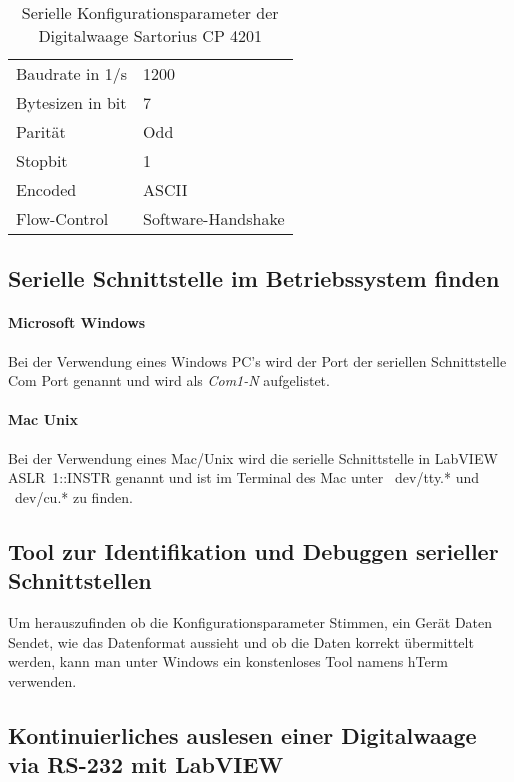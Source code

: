 \documentclass[
fontsize=12pt, 
paper=a4, 
BCOR=10mm, 
twoside=false,
 DIV=10, 
 headsepline, 
 footsepline
 ]{scrartcl}
\begin{document}
\begin{table}[h]
\caption{Serielle Konfigurationsparameter der Digitalwaage Sartorius CP 4201}
\begin{center}

\begin{tabularx}{1\textwidth}{XX}
\hline
Baudrate in 1/s & 1200 \\
Bytesizen in bit & 7  \\
Parität & Odd \\
Stopbit & 1 \\
Encoded & ASCII \\
Flow-Control & Software-Handshake \\
\hline
\end{tabularx}
\end{center}
\label{cp4201}
\end{table}

\subsection{Serielle Schnittstelle im Betriebssystem finden} 
\paragraph{Microsoft Windows} Bei der Verwendung eines Windows PC's wird der Port der seriellen Schnittstelle Com Port genannt und wird als \textit{Com1-N} aufgelistet. 

\paragraph{Mac Unix}Bei der Verwendung eines Mac/Unix wird die serielle Schnittstelle in LabVIEW \mbox{ASLR 1::INSTR} genannt und ist im Terminal des Mac unter ~dev/tty.* und ~dev/cu.* zu finden. 

\subsection{Tool zur Identifikation und Debuggen serieller Schnittstellen} Um herauszufinden ob die Konfigurationsparameter Stimmen, ein Gerät Daten Sendet, wie das Datenformat aussieht und ob die Daten korrekt übermittelt werden, kann man unter Windows ein konstenloses Tool namens hTerm verwenden. \\

\subsection{Kontinuierliches auslesen einer Digitalwaage via RS-232 mit LabVIEW }
\end{document}
